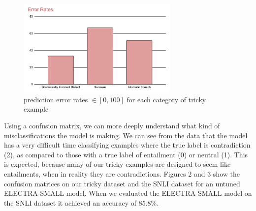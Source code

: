 \documentclass{article}
\begin{document}
\begin{figure}[!h]
	\centering
	\includegraphics[width=0.7\textwidth]{figures/error_rates.png}
	\caption{prediction error rates $\in [0, 100]$ for each category of tricky example}
\end{figure}

Using a confusion matrix, we can more deeply understand what kind of misclassifications the model is making. We can see from the data that the model has a very
difficult time classifying examples where the true label is contradiction (2), as compared to those with a true label of entailment (0) or neutral (1). This is expected, because many of our tricky examples
are designed to seem like entailments, when in reality they are contradictions. Figures 2 and 3 show the confusion
matrices on our tricky dataset and the SNLI dataset for an untuned ELECTRA-SMALL model. When we evaluated the ELECTRA-SMALL
model on the SNLI dataset it achieved an accuracy of 85.8\%.
\end{document}
